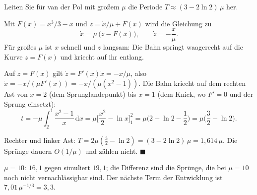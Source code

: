 \begin{aufgabe}
Leiten Sie für van der Pol mit großem $\mu$ die Periode $T \approx (3 - 2\ln 2)\,\mu$ her.

\loesung
{}
Mit $F(x) = x^{3}/3 - x$ und $z = \dot x/\mu + F(x)$ wird die Gleichung zu
\[ \dot x = \mu\,\big(z - F(x)\big), \qquad \dot z = -\frac{x}{\mu} . \]
Für großes $\mu$ ist $x$ schnell und $z$ langsam: Die Bahn springt waagerecht auf die Kurve $z = F(x)$ und kriecht auf ihr entlang.

Auf $z = F(x)$ gilt $\dot z = F'(x)\dot x = -x/\mu$, also $\dot x = -x/(\mu F'(x)) = -x/(\mu(x^{2}-1))$. Die Bahn kriecht auf dem rechten Ast von $x = 2$ (dem Sprunglandepunkt) bis $x = 1$ (dem Knick, wo $F' = 0$ und der Sprung einsetzt):
\[ t = -\mu\int_{2}^{1}\frac{x^{2}-1}{x}\,\mathrm dx = \mu\Big[\frac{x^{2}}{2} - \ln x\Big]_{1}^{2} = \mu\Big(2 - \ln 2 - \frac12\Big) = \mu\Big(\frac32 - \ln 2\Big) . \]

Rechter und linker Ast: $T = 2\mu(\tfrac32 - \ln2) = (3 - 2\ln2)\,\mu = 1{,}614\,\mu$. Die Sprünge dauern $O(1/\mu)$ und zählen nicht. $\blacksquare$

$\mu = 10$: $16{,}1$ gegen simuliert $19{,}1$; die Differenz sind die Sprünge, die bei $\mu = 10$ noch nicht vernachlässigbar sind. Der nächste Term der Entwicklung ist $7{,}01\,\mu^{-1/3} = 3{,}3$. \checkmark

\begin{center}
\begin{minipage}{0.88\textwidth}
\end{minipage}
\end{center}
\end{aufgabe}

